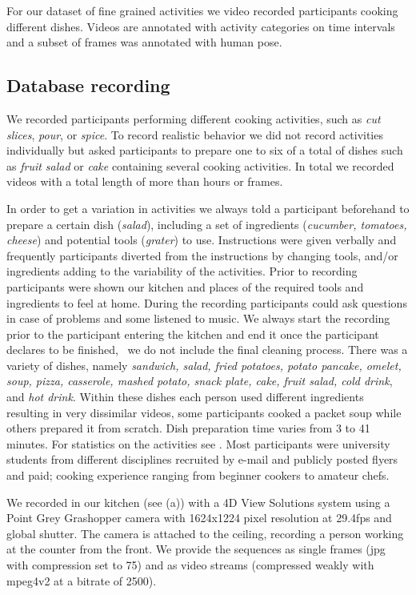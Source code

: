 For our dataset of fine grained activities we video recorded participants cooking different dishes. 
Videos are annotated with activity categories on time intervals and a subset of frames was annotated with human pose.

\subsection{Database recording}
We recorded \DBnSubjects participants performing \DBnActivities different cooking activities, such as \emph{cut slices}, \emph{pour}, or \emph{spice}. To record realistic behavior we did not record activities individually but asked participants to prepare one to six of a total of \DBnTasks dishes such as \emph{fruit salad} or \emph{cake}  containing several cooking activities. In total we recorded \DBnVideoSeq videos with a total length of more than \DBhours hours or \DBnFrames frames.

In order to get a variation in activities we always told a participant beforehand to prepare a certain dish (\eg \emph{salad}), including a set of ingredients (\emph{cucumber, tomatoes, cheese}) and potential tools (\emph{grater}) to use. Instructions were given verbally and frequently participants diverted from the instructions by changing tools, and/or ingredients adding to the variability of the activities. Prior to recording par\-ti\-ci\-pants were shown our kitchen and places of the required tools and ingredients to feel at home. During the recording participants could ask questions in case of problems and some listened to music. We always start the recording prior to the participant entering the kitchen and end it once the participant declares to be finished, \ie\ we do not include the final cleaning process. There was a variety of \DBnTasks dishes, namely \emph{sandwich, salad, fried potatoes, potato pancake, omelet, soup, pizza, casserole, mashed potato, snack plate, cake, fruit salad, cold drink}, and \emph{hot drink}. Within these dishes each person used different ingredients resulting in very dissimilar videos, \eg some participants cooked a packet soup while others prepared it from scratch. Dish preparation time varies from 3 to 41 minutes. For statistics on the activities see .
%  
Most participants were university students from different disciplines recruited by e-mail and publicly posted flyers and paid; cooking experience ranging from beginner cookers to amateur chefs.  %

We recorded  in our kitchen (see (a)) with a 4D View Solutions system using a Point Grey Grashopper camera with 1624x1224 pixel resolution at 29.4fps and global shutter. The camera is attached to the ceiling, recording a person working at the counter from the front. 
We  provide the sequences as single frames (jpg with compression set to 75) and as video streams (compressed weakly with mpeg4v2 at a bitrate of 2500).

